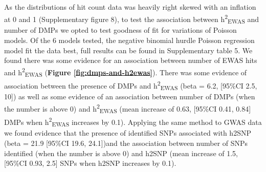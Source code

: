 \documentclass[11pt,oneside]{bristolthesis}
\begin{document}
As the distributions of hit count data was heavily right skewed with an inflation at 0 and 1 (Supplementary figure 8), to test the association between h\textsuperscript{2}\textsubscript{EWAS} and number of DMPs we opted to test goodness of fit for variations of Poisson models. Of the 6 models tested, the negative binomial hurdle Poisson regression model fit the data best, full results can be found in Supplementary table 5. We found there was some evidence for an association between number of EWAS hits and h\textsuperscript{2}\textsubscript{EWAS} (\textbf{Figure \ref{fig:dmps-and-h2ewas}}). There was some evidence of association between the presence of DMPs and h\textsuperscript{2}\textsubscript{EWAS} (beta = 6.2, {[}95\%CI 2.5, 10{]}) as well as some evidence of an association between number of DMPs (when the number is above 0) and h\textsuperscript{2}\textsubscript{EWAS} (mean increase of 0.63, {[}95\%CI 0.41, 0.84{]} DMPs when h\textsuperscript{2}\textsubscript{EWAS} increases by 0.1). Applying the same method to GWAS data we found evidence that the presence of identified SNPs associated with h2SNP (beta = 21.9 {[}95\%CI 19.6, 24.1{]})and the association between number of SNPs identified (when the number is above 0) and h2SNP (mean increase of 1.5, {[}95\%CI 0.93, 2.5{]} SNPs when h2SNP increases by 0.1).
\end{document}
